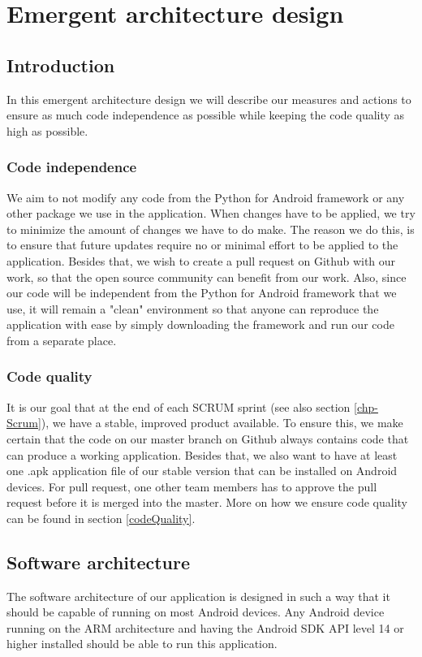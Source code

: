 \chapter{Emergent architecture design}

\section{Introduction}
In this emergent architecture design we will describe our measures and actions to ensure as much code independence as possible while keeping the code quality as high as possible.

\subsection{Code independence}
We aim to not modify any code from the Python for Android framework or any other package we use in the application. When changes have to be applied, we try to minimize the amount of changes we have to do make.
The reason we do this, is to ensure that future updates require no or minimal effort to be applied to the application.
Besides that, we wish to create a pull request on Github with our work, so that the open source community can benefit from our work.
Also, since our code will be independent from the Python for Android framework that we use, it will remain a "clean" environment so that anyone can reproduce the application with ease by simply downloading the framework and run our code from a separate place.

\subsection{Code quality}
It is our goal that at the end of each SCRUM sprint (see also section \ref{chp-Scrum}), we have a stable, improved product available. To ensure this, we make certain that the code on our master branch on Github always contains code that can produce a working application. Besides that, we also want to have at least one .apk application file of our stable version that can be installed on Android devices. For pull request, one other team members has to approve the pull request before it is merged into the master.
More on how we ensure code quality can be found in section \ref{codeQuality}.

\section{Software architecture}
 The software architecture of our application is designed in such a way that it should be capable of running on most Android devices. Any Android device running on the ARM architecture and having the Android SDK API level 14 or higher installed should be able to run this application.
 
